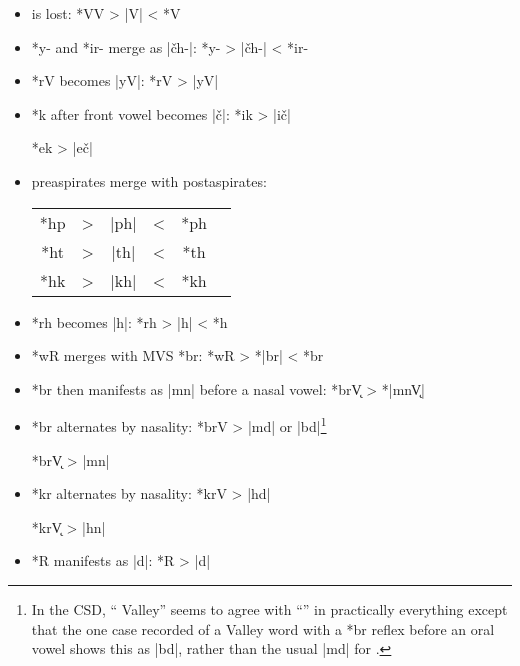 \documentclass[output=paper]{LSP/langsci}
\begin{document}
\begin{itemize}
\item {} is lost: \hspace{4.2em} *VV	>	|V|	<	*V

\item *y- and *ir- merge as |\v{c}h-|: \hspace{2em} *y-	>	|\v{c}h-|	<	*ir-

\item *rV becomes |yV|:	 \hspace{5.3em} *rV	>	|yV|

\item *k after front vowel becomes |\v{c}|: \hspace{1em} *ik	>	|i\v{c}|

\hspace{14.2em} *ek	>	|e\v{c}|

\item preaspirates merge with postaspirates:



\begin{tabular}[t]{c c c c c c }
*hp & > & |ph| & < & *ph \\
*ht	& > & |th| & < & *th \\
*hk & > & |kh| & < & *kh \\
\end{tabular}

\item *rh becomes |h|: \hspace{4em} *rh	>	|h|	<	*h

\item *wR merges with MVS *br: \hspace{1em}*wR	>	*|br|	<	*br
\item  {} *br then manifests as |mn| before a nasal vowel:              *br\k{V}    >          *|mn\k{V}|
\end{itemize}


\begin{itemize}
\item  *br alternates by nasality: \hspace{1em} *brV		>	|md| or |bd|\footnote{In the CSD, `` Valley'' seems to agree with ``'' in practically everything except that the one case recorded of a  Valley word with a *br reflex before an oral vowel shows this as |bd|, rather than the usual |md| for .}

\hspace{12em} *br\k{V}	>	|mn|

\item  *kr alternates by nasality:  \hspace{1.2em} *krV       >          |hd|

\hspace{12em} *kr\k{V}	>	|hn|

\item *R manifests as |d|: \hspace{4.5em} *R	>	|d|
\end{itemize}
\end{document}
